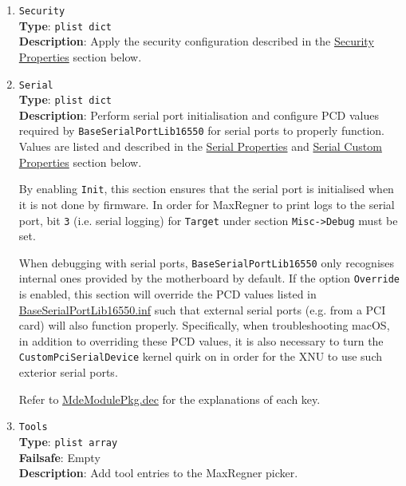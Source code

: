 \documentclass[]{article}
\begin{document}
\begin{enumerate}
  To be filled with \texttt{plist\ dict} values, describing each load entry.
  Refer to the \hyperref[miscentryprops]{Entry Properties} section below for details.

\item
  \texttt{Security}\\
  \textbf{Type}: \texttt{plist\ dict}\\
  \textbf{Description}: Apply the security configuration described in the
  \hyperref[miscsecurityprops]{Security Properties} section below.

\item
  \texttt{Serial}\\
  \textbf{Type}: \texttt{plist\ dict}\\
  \textbf{Description}: Perform serial port initialisation and
  configure PCD values required by \texttt{BaseSerialPortLib16550} for serial ports to properly function.
  Values are listed and described in the \hyperref[miscserialprops]{Serial Properties} and \hyperref[miscserialcustprops]{Serial Custom Properties} section below.

  By enabling \texttt{Init}, this section ensures that the serial port is initialised when it is not done by firmware.
  In order for MaxRegner to print logs to the serial port, bit \texttt{3} (i.e. serial logging) for \texttt{Target}
  under section \texttt{Misc->Debug} must be set.

  When debugging with serial ports, \texttt{BaseSerialPortLib16550} only recognises internal ones
  provided by the motherboard by default. If the option \texttt{Override} is enabled, this section will override the PCD values listed in
  \href{https://github.com/acidanthera/audk/blob/master/MdeModulePkg/Library/BaseSerialPortLib16550/BaseSerialPortLib16550.inf}{BaseSerialPortLib16550.inf}
  such that external serial ports (e.g. from a PCI card) will also function properly. Specifically, when troubleshooting macOS,
  in addition to overriding these PCD values, it is also necessary to turn the \texttt{CustomPciSerialDevice} kernel quirk on in order for
  the XNU to use such exterior serial ports.


  Refer to \href{https://github.com/acidanthera/audk/blob/master/MdeModulePkg/MdeModulePkg.dec}{MdeModulePkg.dec} for the explanations of each key.

\item
  \texttt{Tools}\label{misctools}\\
  \textbf{Type}: \texttt{plist\ array}\\
  \textbf{Failsafe}: Empty\\
  \textbf{Description}: Add tool entries to the MaxRegner picker.


\end{enumerate}
\end{document}
